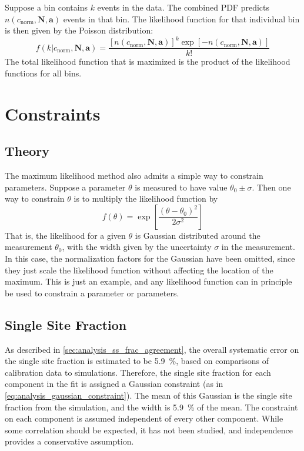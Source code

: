 \documentclass[herrin-thesis.tex]{subfiles}
\begin{document}
Suppose a bin contains \(k\) events in the data. The combined PDF predicts \(n(c_\text{norm}, \mathbf{N}, \mathbf{a})\) events in that bin. The likelihood function for that individual bin is then given by the Poisson distribution:
\begin{equation}
f(k|c_\text{norm}, \mathbf{N}, \mathbf{a}) = \frac{[n(c_\text{norm}, \mathbf{N}, \mathbf{a})]^k \exp[-n(c_\text{norm}, \mathbf{N}, \mathbf{a})]}{k!}
\end{equation}
The total likelihood function that is maximized is the product of the likelihood functions for all bins.

\section{Constraints}
\subsection{Theory}
The maximum likelihood method also admits a simple way to constrain parameters. Suppose a parameter \(\theta\) is measured to have value \(\theta_0 \pm \sigma\). Then one way to constrain \(\theta\) is to multiply the likelihood function by
\begin{equation}
f(\theta) = \exp\left[\frac{(\theta-\theta_0)^2}{2\sigma^2}\right]
\label{eq:analysis_gaussian_constraint}
\end{equation}
That is, the likelihood for a given \(\theta\) is Gaussian distributed around the measurement \(\theta_0\), with the width given by the uncertainty \(\sigma\) in the measurement. In this case, the normalization factors for the Gaussian have been omitted, since they just scale the likelihood function without affecting the location of the maximum. This is just an example, and any likelihood function can in principle be used to constrain a parameter or parameters.

\subsection{Single Site Fraction}
As described in \cref{sec:analysis_ss_frac_agreement}, the overall systematic error on the single site fraction is estimated to be \SI{5.9}{\percent}, based on comparisons of calibration data to simulations. Therefore, the single site fraction for each component in the fit is assigned a Gaussian constraint (as in \cref{eq:analysis_gaussian_constraint}). The mean of this Gaussian is the single site fraction from the simulation, and the width is \SI{5.9}{\percent} of the mean. The constraint on each component is assumed independent of every other component. While some correlation should be expected, it has not been studied, and independence provides a conservative assumption.
\end{document}
